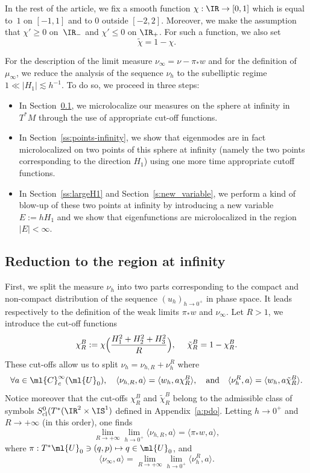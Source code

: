 \documentclass[JEP,XML,SOM,Unicode, NoEqCountersInSection,published]{cedram}
\newcommand\mto{\mathchoice{\longmapsto}{\mapsto}{\mapsto}{\mapsto}}
\theoremstyle{plain}
\theoremstyle{definition}
\theoremstyle{remark}
\begin{document}
In the rest of the article, we fix a smooth function $\chi:\IR\to [0,1]$ which is equal to~$1$ on $[-1,1]$ and to $0$ outside $[-2,2]$. Moreover, we make the assumption that $\chi'\geq 0$ on~$\IR_-$ and $\chi'\leq 0$ on $\IR_+$. For such a function, we also set
\begin{equation}\label{e:partition-unity}
\tilde{\chi}=1-\chi.
\end{equation}

For the description of the limit measure $\nu_\infty = \nu - \pi_*w$ and for the definition of $\mu_\infty$, we reduce the analysis of the sequence $\nu_h$ to the subelliptic regime $1 \ll \vert H_1 \vert \lesssim h^{-1}$. To do so, we proceed in three steps:
\begin{itemize}
\item In Section~\ref{ss:sphere-infinity}, we microlocalize our measures on the sphere at infinity in $T^*M$ through the use of appropriate cut-off functions.
\item In Section~\ref{ss:points-infinity}, we show that eigenmodes are in fact microlocalized on two points of this sphere at infinity (namely the two points corresponding to the direction $H_1$) using one more time appropriate cutoff functions.
\item In Section~\ref{ss:largeH1} and Section~\ref{s:new_variable}, we perform a kind of blow-up of these two points at infinity by introducing a new variable $E:=hH_1$ and we show that eigenfunctions are microlocalized in the region $|E|<\infty$.
\end{itemize}

\subsection{Reduction to the region at infinity}\label{ss:sphere-infinity}

First, we split the measure $\nu_h$ into two parts corresponding to the compact and non-compact distribution of the sequence $(u_h)_{h\to 0^+}$ in phase space. It leads respectively to the definition of the weak limits $\pi_* w$ and $\nu_\infty$. Let $R>1$, we introduce the cut-off functions
\begin{equation}\label{e:cutoff-cone}
\chi_R^B:=\chi\Bigl(\frac{H_1^2+H_2^2+H_3^2}{R}\Bigr),\ \quad\tilde{\chi}_R^B=1-\chi_R^B.
\end{equation}
These cut-offs allow us to split $\nu_h=\nu_{h,R}+\nu_h^R$ where
\[
\forall a\in\ml{C}^\infty_c(\ml{U}_0),\quad\langle \nu_{h,R},a\rangle=\langle w_h, a\chi_R^B\rangle,\quad\text{and}\quad\langle \nu_{h}^R,a\rangle=\langle w_h, a\tilde{\chi}_R^B\rangle.
\]
Notice moreover that the cut-offs $\chi_R^B$ and $\tilde{\chi}_R^B$ belong to the admissible class of symbols $S^0_{\operatorname{cl}}(T^*(\IR^2\times\IS^1)$ defined in Appendix~\ref{a:pdo}. Letting $h\to 0^+$ and $R\to +\infty$ (in this order), one finds
\[
\lim_{R\to +\infty}\lim_{h\to 0^+}\langle \nu_{h,R},a\rangle= \langle\pi_* w,a\rangle,
\]
where $\pi: T^*\ml{U}_0 \ni (q,p) \mto q\in\ml{U}_0$, and
\begin{equation}%
\langle \nu_\infty,a\rangle = \lim_{R\to +\infty}\lim_{h\to 0^+}\langle \nu_{h}^R,a\rangle.
\end{equation}
\end{document}
